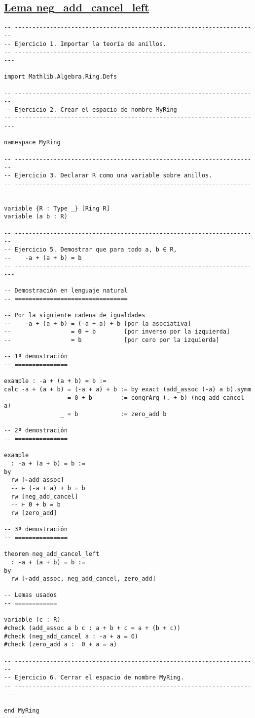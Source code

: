 \subsection{\href{./src/Basicos/neg\_add\_cancel\_left.lean}{Lema neg\_add\_cancel\_left}}
\label{sec:org54af647}
\begin{verbatim}
-- ---------------------------------------------------------------------
-- Ejercicio 1. Importar la teoría de anillos.
-- ----------------------------------------------------------------------

import Mathlib.Algebra.Ring.Defs

-- ---------------------------------------------------------------------
-- Ejercicio 2. Crear el espacio de nombre MyRing
-- ----------------------------------------------------------------------

namespace MyRing

-- ---------------------------------------------------------------------
-- Ejercicio 3. Declarar R como una variable sobre anillos.
-- ----------------------------------------------------------------------

variable {R : Type _} [Ring R]
variable (a b : R)

-- ---------------------------------------------------------------------
-- Ejercicio 5. Demostrar que para todo a, b ∈ R,
--    -a + (a + b) = b
-- ----------------------------------------------------------------------

-- Demostración en lenguaje natural
-- ================================

-- Por la siguiente cadena de igualdades
--    -a + (a + b) = (-a + a) + b [por la asociativa]
--                 = 0 + b        [por inverso por la izquierda]
--                 = b            [por cero por la izquierda]

-- 1ª demostración
-- ===============

example : -a + (a + b) = b :=
calc -a + (a + b) = (-a + a) + b := by exact (add_assoc (-a) a b).symm
                _ = 0 + b        := congrArg (. + b) (neg_add_cancel a)
                _ = b            := zero_add b

-- 2ª demostración
-- ===============

example
  : -a + (a + b) = b :=
by
  rw [←add_assoc]
  -- ⊢ (-a + a) + b = b
  rw [neg_add_cancel]
  -- ⊢ 0 + b = b
  rw [zero_add]

-- 3ª demostración
-- ===============

theorem neg_add_cancel_left
  : -a + (a + b) = b :=
by
  rw [←add_assoc, neg_add_cancel, zero_add]

-- Lemas usados
-- ============

variable (c : R)
#check (add_assoc a b c : a + b + c = a + (b + c))
#check (neg_add_cancel a : -a + a = 0)
#check (zero_add a :  0 + a = a)

-- ---------------------------------------------------------------------
-- Ejercicio 6. Cerrar el espacio de nombre MyRing.
-- ----------------------------------------------------------------------

end MyRing
\end{verbatim}

